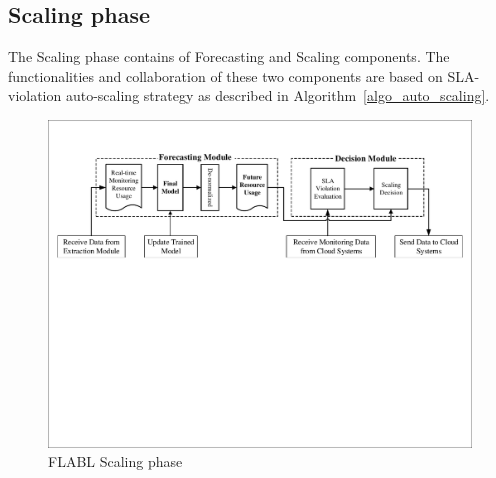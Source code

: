 \documentclass[runningheads]{llncs}
\begin{document}
\subsection{Scaling phase}
\label{scaling_phase}

The Scaling phase contains of Forecasting and Scaling components. The functionalities and collaboration of these two components are based on SLA-violation auto-scaling strategy as described in Algorithm~\ref{algo_auto_scaling}.

\begin{figure}
	\begin{center}
		\includegraphics[width=1.0\textwidth =0cm 0cm 0cm 0cm, clip]{images/pdf/Forecasting_Module.pdf}
		\caption{FLABL Scaling phase}
		\label{FLABLscaling}
	\end{center}
\end{figure}

\end{document}
